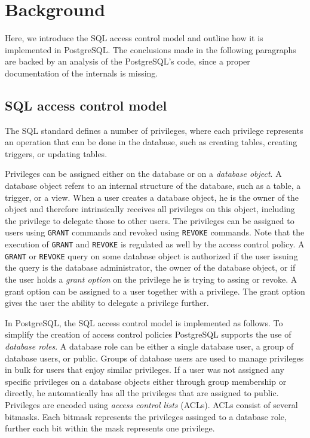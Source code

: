 \section{Background}

Here, we introduce the SQL access control model and outline how it is implemented in PostgreSQL.
%
The conclusions made in the following paragraphs are backed by an analysis of the  PostgreSQL's code, since a proper documentation of the internals is missing.

\subsection{SQL access control model}

The SQL standard defines a number of privileges, where each privilege represents an operation that can be done in the database, such as creating tables, creating triggers, or updating tables.

Privileges can be assigned either on the database or on a \emph{database object}.
%
A database object refers to an internal structure of the database, such as a table, a trigger, or a view. 
%
When a user creates a database object, he is the owner of the object and therefore intrinsically receives all privileges on this object, including the privilege to delegate those to other users.
%
The privileges can be assigned to users using \texttt{GRANT} commands and revoked using \texttt{REVOKE} commands.
%
Note that the execution of  \texttt{GRANT} and \texttt{REVOKE} is regulated as well by the access control policy. 
%
A \texttt{GRANT} or \texttt{REVOKE} query on some database object is authorized if the user issuing the query is the database administrator, the owner of the database object, or if the user holds a \emph{grant option} on the privilege he is trying to assing or revoke.
%
A grant option can be assigned to a user together with a privilege.
%
The grant option gives the user the ability to delegate a privilege further.

In PostgreSQL, the SQL access control model is implemented as follows.
%
To simplify the creation of access control policies PostgreSQL supports the use of \emph{database roles}.
%
A database role can be either a single database user, a group of database users, or public. 
%
Groups of database users are used to manage privileges in bulk for users that enjoy similar privileges.
%
If a user was not assigned any specific privileges on a database objects either through group membership or directly, he automatically has all the privileges that are assigned to public.
%
Privileges are encoded using \emph{access control lists} (ACLs).
%
ACLs consist of several bitmasks.
%
Each bitmask represents the privileges assinged to a database role, further each bit within the mask represents one privilege.
%

